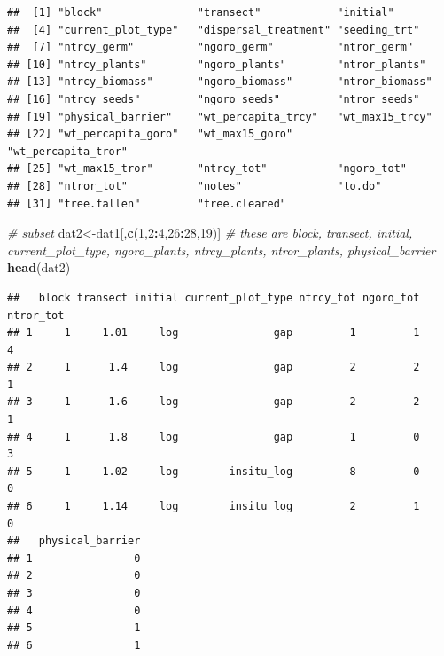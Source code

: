 \documentclass[
]{article}
\newenvironment{Shaded}{\begin{snugshade}}{\end{snugshade}}
\newcommand{\CommentTok}[1]{\textcolor[rgb]{0.56,0.35,0.01}{\textit{#1}}}
\newcommand{\DecValTok}[1]{\textcolor[rgb]{0.00,0.00,0.81}{#1}}
\newcommand{\FunctionTok}[1]{\textcolor[rgb]{0.13,0.29,0.53}{\textbf{#1}}}
\newcommand{\NormalTok}[1]{#1}
\newcommand{\OtherTok}[1]{\textcolor[rgb]{0.56,0.35,0.01}{#1}}
\newcommand{\SpecialCharTok}[1]{\textcolor[rgb]{0.81,0.36,0.00}{\textbf{#1}}}
\begin{document}
\begin{verbatim}
##  [1] "block"               "transect"            "initial"            
##  [4] "current_plot_type"   "dispersal_treatment" "seeding_trt"        
##  [7] "ntrcy_germ"          "ngoro_germ"          "ntror_germ"         
## [10] "ntrcy_plants"        "ngoro_plants"        "ntror_plants"       
## [13] "ntrcy_biomass"       "ngoro_biomass"       "ntror_biomass"      
## [16] "ntrcy_seeds"         "ngoro_seeds"         "ntror_seeds"        
## [19] "physical_barrier"    "wt_percapita_trcy"   "wt_max15_trcy"      
## [22] "wt_percapita_goro"   "wt_max15_goro"       "wt_percapita_tror"  
## [25] "wt_max15_tror"       "ntrcy_tot"           "ngoro_tot"          
## [28] "ntror_tot"           "notes"               "to.do"              
## [31] "tree.fallen"         "tree.cleared"
\end{verbatim}

\begin{Shaded}
\begin{Highlighting}[]
\CommentTok{\# subset}
\NormalTok{dat2}\OtherTok{\textless{}{-}}\NormalTok{dat1[,}\FunctionTok{c}\NormalTok{(}\DecValTok{1}\NormalTok{,}\DecValTok{2}\SpecialCharTok{:}\DecValTok{4}\NormalTok{,}\DecValTok{26}\SpecialCharTok{:}\DecValTok{28}\NormalTok{,}\DecValTok{19}\NormalTok{)] }\CommentTok{\# these are block, transect, initial, current\_plot\_type, ngoro\_plants, ntrcy\_plants, ntror\_plants, physical\_barrier}
\FunctionTok{head}\NormalTok{(dat2)}
\end{Highlighting}
\end{Shaded}

\begin{verbatim}
##   block transect initial current_plot_type ntrcy_tot ngoro_tot ntror_tot
## 1     1     1.01     log               gap         1         1         4
## 2     1      1.4     log               gap         2         2         1
## 3     1      1.6     log               gap         2         2         1
## 4     1      1.8     log               gap         1         0         3
## 5     1     1.02     log        insitu_log         8         0         0
## 6     1     1.14     log        insitu_log         2         1         0
##   physical_barrier
## 1                0
## 2                0
## 3                0
## 4                0
## 5                1
## 6                1
\end{verbatim}
\end{document}
